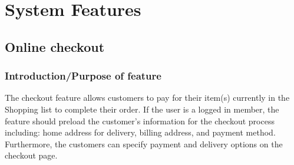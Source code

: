 \documentclass{scrreprt}
\theoremstyle{funreq}
\begin{document}
\section{System Features}



\subsection{Online checkout}	
	\subsubsection{Introduction/Purpose of feature}
	The checkout feature allows customers to pay for their item(s) currently in the Shopping list to complete their order. If the user is a logged in member, the feature should preload the customer’s information for the checkout process including: home address for delivery, billing address, and payment method. Furthermore, the customers can specify payment and delivery options on the checkout page. 
	
%	
%	
\end{document}
